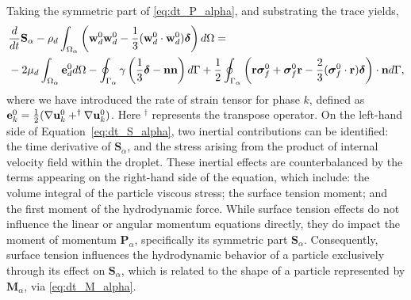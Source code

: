 Taking the symmetric part of \ref{eq:dt_P_alpha}, and substrating the trace yields, 
\begin{align}
    &\ddt {\textbf{S}_\alpha}
    - \rho_d\intO{\left(\textbf{w}_d^0 \textbf{w}_d^0 -\frac{1}{3} (\textbf{w}_d^0 \cdot  \textbf{w}_d^0)\bm\delta\right)}
    = \nonumber \\
    &- 2\mu_d\intO{\textbf{e}_d^0}
    -  \intS{ \gamma
        \left( \frac{1}{3}\bm\delta - \textbf{nn} \right)
    }
    + \frac{1}{2}\intS{\left(\textbf{r}\bm\sigma_f^0+\bm\sigma_f^0\textbf{r}-\frac{2}{3}(\bm\sigma_f^0 \cdot \textbf{r})\bm\delta \right)\cdot \textbf{n}},
    \label{eq:dt_S_alpha}
\end{align}
where we have introduced the rate of strain tensor for phase \( k \), defined as \( \mathbf{e}_k^0 = \frac{1}{2} (\mathbf{\nabla} \mathbf{u}_k^0 + ^\dagger \mathbf{\nabla} \mathbf{u}_k^0) \). 
Here $^\dagger$ represents the transpose operator. 
On the left-hand side of Equation~\ref{eq:dt_S_alpha}, two inertial contributions can be identified: the time derivative of $\mathbf{S}_\alpha$, and the stress arising from the product of internal velocity field within the droplet. 
These inertial effects are counterbalanced by the terms appearing on the right-hand side of the equation, which include: the volume integral of the particle viscous stress; the surface tension moment; and the first moment of the hydrodynamic force.
While surface tension effects do not influence the linear or angular momentum equations directly, they do impact the moment of momentum $\textbf{P}_\alpha$, specifically its symmetric part $\textbf{S}_\alpha$.
Consequently, surface tension influences the hydrodynamic behavior of a particle exclusively through its effect on $\textbf{S}_\alpha$, which is related to the shape of a particle represented by $\textbf{M}_\alpha$, via \ref{eq:dt_M_alpha}.
